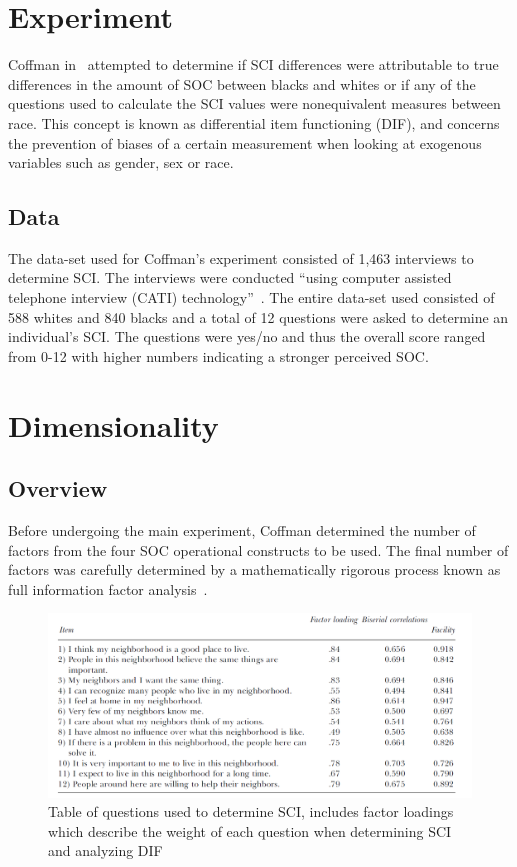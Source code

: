 \documentclass{sig-alternate}
\begin{document}
\section{Experiment}
\label{sec:experiment}
Coffman in~\cite{disparities:2009} attempted to determine if SCI differences were attributable to true differences in the amount of SOC between blacks and whites or if any of the questions used to calculate the SCI values were nonequivalent measures between race. This concept is known as differential item functioning (DIF), and concerns the prevention of biases of a certain measurement when looking at exogenous variables such as gender, sex or race. 

\subsection{Data}
The data-set used for Coffman's experiment consisted of 1,463 interviews to determine SCI. The interviews were conducted ``using computer assisted telephone interview (CATI) technology''~\cite{disparities:2009}. The entire data-set used consisted of 588 whites and 840 blacks and a total of 12 questions were asked to determine an individual's SCI. The questions were yes/no and thus the overall score ranged from 0-12 with higher numbers indicating a stronger perceived SOC. 

\section{Dimensionality}
\label{sec:dimensionality}
\subsection{Overview}
Before undergoing the main experiment, Coffman determined the number of factors from the four SOC operational constructs to be used. The final number of factors was carefully determined by a mathematically rigorous process known as full information factor analysis~\cite{analysis:1988}. 
\begin{figure}
\centering
\includegraphics[scale=0.45]{Images/questions.png}
\caption{Table of questions used to determine SCI, includes factor loadings which describe the weight of each question when determining SCI and analyzing DIF~\cite{disparities:2009}}
\label{fig:questions}
\end{figure}
\end{document}
